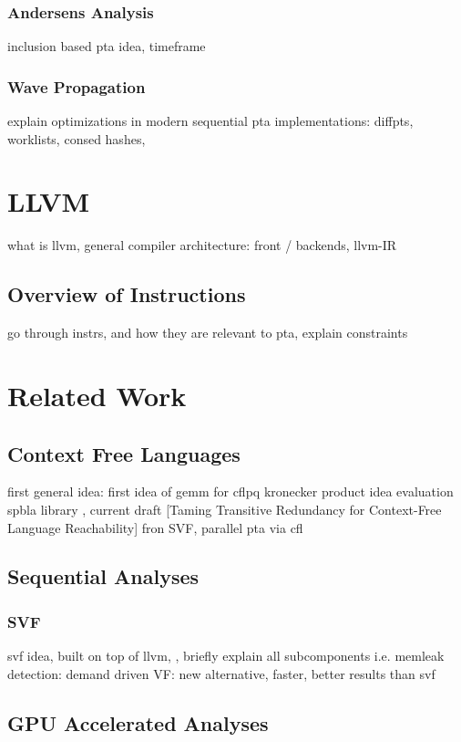 \subsubsection{Andersens Analysis}
inclusion based pta idea, timeframe
\subsubsection{Wave Propagation}
explain optimizations in modern sequential pta implementations: diffpts, worklists, consed hashes, \autocite{pereirawave}
\section{LLVM}
what is llvm, general compiler architecture: front / backends, llvm-IR
\subsection{Overview of Instructions}
go through instrs, and how they are relevant to pta, explain constraints \autocite{lin2015alias}
\section{Related Work}
\subsection{Context Free Languages}
first general idea: \autocite{reps1998program} first idea of gemm for cflpq \autocite{azimov2018context} kronecker product idea \autocite{orachev2020context} evaluation \autocite{mishin2019evaluation} spbla library \autocite{orachev2021spbla}, current draft [Taming Transitive Redundancy for Context-Free Language Reachability] fron SVF, parallel pta via cfl \autocite{su2014parallel}
\subsection{Sequential Analyses}
\subsubsection{SVF}
svf idea, built on top of llvm, \autocite{sui2016svf}, briefly explain all subcomponents i.e. memleak detection: \autocite{sui2014detecting} demand driven VF: \autocite{sui2018value} new alternative, faster, better results than svf \autocite{shi2018pinpoint}
\subsection{GPU Accelerated Analyses}
